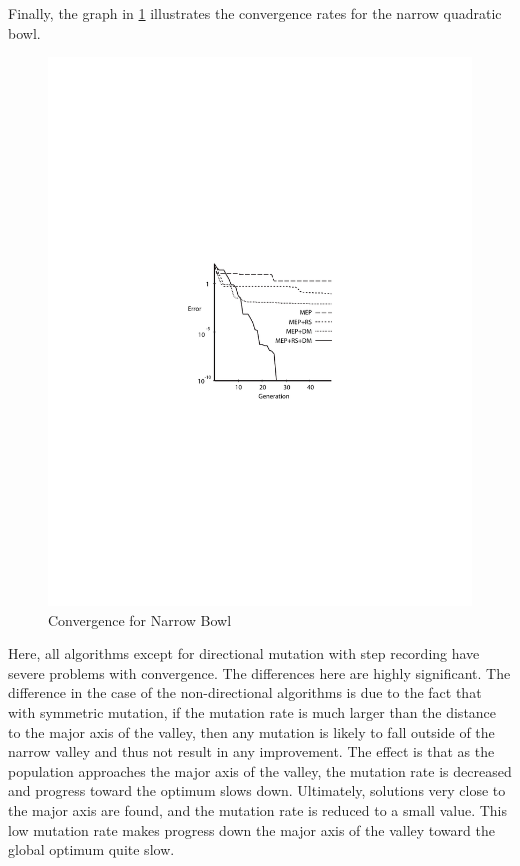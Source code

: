 \documentclass[12pt, titlepage]{article}
\begin{document}
Finally, the graph in \ref{fig:f3} illustrates the convergence rates for the
narrow quadratic bowl.
\begin{figure}
\centerline{\includegraphics{fig3}}
\caption{Convergence for Narrow Bowl}\label{fig:f3}
\end{figure}

Here, all algorithms except for directional mutation with step
recording have severe problems with convergence.  The differences here
are highly significant.  The difference in the case of the
non-directional algorithms is due to the fact that with symmetric
mutation, if the mutation rate is much larger than the distance to the
major axis of the valley, then any mutation is likely to fall outside
of the narrow valley and thus not result in any improvement.  The
effect is that as the population approaches the major axis of the
valley, the mutation rate is decreased and progress toward the optimum
slows down.  Ultimately, solutions very close to the major axis are
found, and the mutation rate is reduced to a small value.  This low
mutation rate makes progress down the major axis of the valley toward
the global optimum quite slow.
\end{document}
